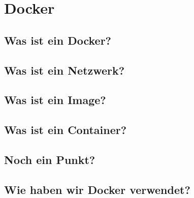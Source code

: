 \section{Docker}\label{Docker}


\subsection{Was ist ein Docker?}


\subsection{Was ist ein Netzwerk?}



\subsection{Was ist ein Image?}



\subsection{Was ist ein Container?}



\subsection{Noch ein Punkt?}




\subsection{Wie haben wir Docker verwendet?}

